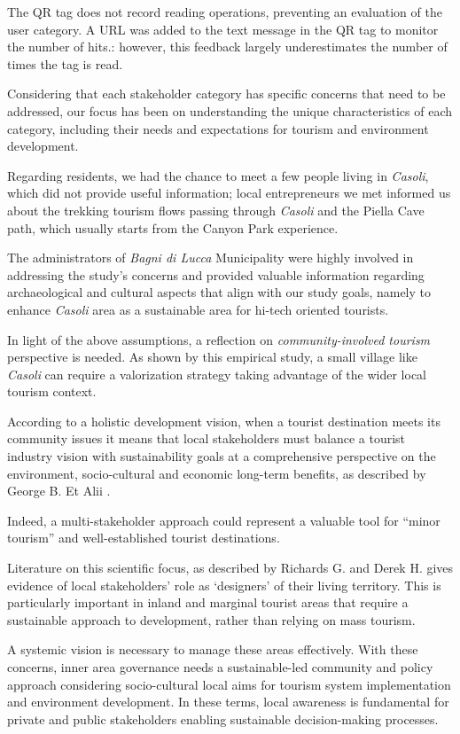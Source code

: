\documentclass[sustainability,article,submit,pdftex,moreauthors]{Definitions/mdpi}
\begin{document}
The QR tag does not record reading operations, preventing an evaluation of the user category. A URL was added to the text message in the QR tag to monitor the number of hits.: however, this feedback largely underestimates the number of times the tag is read. 

Considering that each stakeholder category has specific concerns that need to be addressed, our focus has been on understanding the unique characteristics of each category, including their needs and expectations for tourism and environment development. 

Regarding residents, we had the chance to meet a few people living in \emph{Casoli}, which did not provide useful information; local entrepreneurs we met informed us about the trekking tourism flows passing through \emph{Casoli}  and the Piella Cave path, which usually starts from the Canyon Park experience.

The administrators of \emph{Bagni di Lucca} Municipality were highly involved in addressing the study's concerns and provided valuable information regarding archaeological and cultural aspects that align with our study goals, namely to enhance \emph{Casoli}  area as a sustainable area for hi-tech oriented tourists. 

In light of the above assumptions, a reflection on \textit{community-involved tourism} perspective is needed. As shown by this empirical study, a small village like \emph{Casoli}  can require a valorization strategy taking advantage of the wider local tourism context. 

According to a holistic development vision, when a tourist destination meets its community issues it means that local stakeholders must balance a tourist industry vision with sustainability goals at a comprehensive perspective on the environment, socio-cultural and economic long-term benefits, as described by George B. Et Alii \cite {geo07}. 

Indeed,  a multi-stakeholder approach could represent a valuable tool for “minor tourism” and well-established tourist destinations. 

Literature on this scientific focus, as described by Richards G. and Derek H. \cite {ric03} gives evidence of local stakeholders' role as ‘designers’ of their living territory.
This is particularly important in inland and marginal tourist areas that require a sustainable approach to development, rather than relying on mass tourism. 

A systemic vision is necessary to manage these areas effectively. With these concerns, inner area governance needs a sustainable-led community and policy approach considering socio-cultural local aims for tourism system implementation and environment development. 
In these terms, local awareness is fundamental for private and public stakeholders enabling sustainable decision-making processes. 
\end{document}
